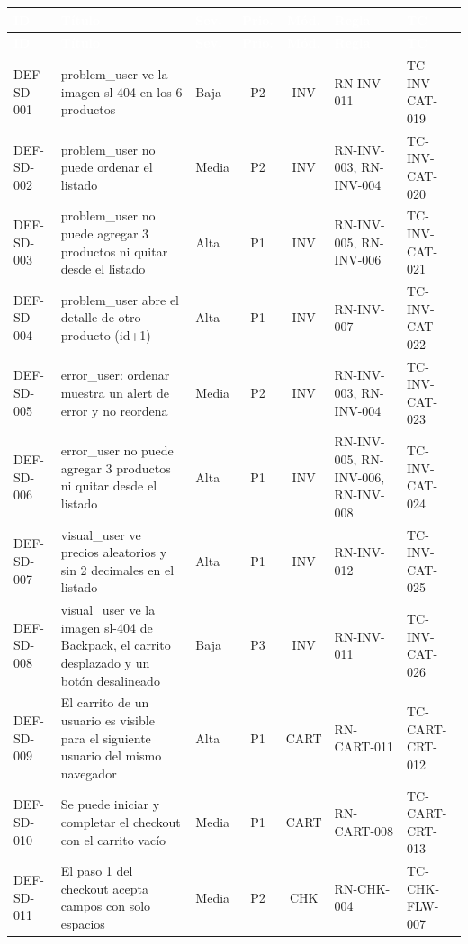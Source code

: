 \documentclass[10pt,a4paper]{article}
\newcommand{\tabhead}{\rowcolor{primary}}
\newcommand{\hcell}[1]{\textcolor{white}{\bfseries #1}}
\newcommand{\zebrarows}{\rowcolors{2}{zebra}{white}}
\begin{document}
{\zebrarows\footnotesize\setlength{\tabcolsep}{3pt}
\begin{longtable}{|L{0.1\textwidth}|L{0.34\textwidth}|L{0.065\textwidth}|c|c|L{0.12\textwidth}|L{0.13\textwidth}|}
\hline
\tabhead \hcell{ID} & \hcell{Título} & \hcell{Sev.} & \hcell{Prio.} & \hcell{Mód.} & \hcell{Regla} & \hcell{TC} \\ \hline
\endfirsthead
\hline
\tabhead \hcell{ID} & \hcell{Título} & \hcell{Sev.} & \hcell{Prio.} & \hcell{Mód.} & \hcell{Regla} & \hcell{TC} \\ \hline
\endhead
DEF-SD-001 & problem\_\allowbreak{}user ve la imagen sl-404 en los 6 productos & Baja & P2 & INV & RN-INV-011 & TC-INV-CAT-019 \\ \hline
DEF-SD-002 & problem\_\allowbreak{}user no puede ordenar el listado & Media & P2 & INV & RN-INV-003, RN-INV-004 & TC-INV-CAT-020 \\ \hline
DEF-SD-003 & problem\_\allowbreak{}user no puede agregar 3 productos ni quitar desde el listado & Alta & P1 & INV & RN-INV-005, RN-INV-006 & TC-INV-CAT-021 \\ \hline
DEF-SD-004 & problem\_\allowbreak{}user abre el detalle de otro producto (id+1) & Alta & P1 & INV & RN-INV-007 & TC-INV-CAT-022 \\ \hline
DEF-SD-005 & error\_\allowbreak{}user: ordenar muestra un alert de error y no reordena & Media & P2 & INV & RN-INV-003, RN-INV-004 & TC-INV-CAT-023 \\ \hline
DEF-SD-006 & error\_\allowbreak{}user no puede agregar 3 productos ni quitar desde el listado & Alta & P1 & INV & RN-INV-005, RN-INV-006, RN-INV-008 & TC-INV-CAT-024 \\ \hline
DEF-SD-007 & visual\_\allowbreak{}user ve precios aleatorios y sin 2 decimales en el listado & Alta & P1 & INV & RN-INV-012 & TC-INV-CAT-025 \\ \hline
DEF-SD-008 & visual\_\allowbreak{}user ve la imagen sl-404 de Backpack, el carrito desplazado y un botón desalineado & Baja & P3 & INV & RN-INV-011 & TC-INV-CAT-026 \\ \hline
DEF-SD-009 & El carrito de un usuario es visible para el siguiente usuario del mismo navegador & Alta & P1 & CART & RN-CART-011 & TC-CART-CRT-012 \\ \hline
DEF-SD-010 & Se puede iniciar y completar el checkout con el carrito vacío & Media & P1 & CART & RN-CART-008 & TC-CART-CRT-013 \\ \hline
DEF-SD-011 & El paso 1 del checkout acepta campos con solo espacios & Media & P2 & CHK & RN-CHK-004 & TC-CHK-FLW-007 \\ \hline

\end{longtable}}
\end{document}
